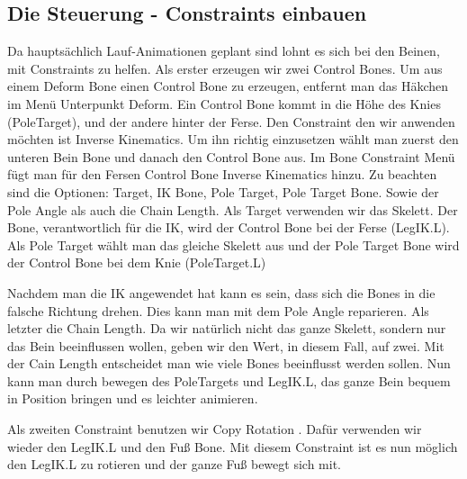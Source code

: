 \subsection{Die Steuerung - Constraints einbauen}
Da hauptsächlich Lauf-Animationen geplant sind lohnt es sich bei den Beinen, mit Constraints zu helfen.
Als erster erzeugen wir zwei Control Bones. Um aus einem Deform Bone einen Control Bone zu erzeugen, entfernt man das Häkchen im Menü Unterpunkt
\dq Deform\dq. Ein Control Bone kommt in die Höhe des Knies (PoleTarget), und der andere hinter der Ferse. Den Constraint den wir anwenden möchten ist
\dq Inverse Kinematics\dq. Um ihn richtig einzusetzen wählt man zuerst den unteren Bein Bone und danach den Control Bone aus. Im Bone Constraint Menü fügt man für den Fersen Control Bone
Inverse Kinematics hinzu. Zu beachten sind die Optionen: Target, IK Bone, Pole Target, Pole Target Bone. Sowie der Pole Angle als auch die Chain Length. Als Target verwenden wir das Skelett.
Der Bone, verantwortlich für die IK,
wird der Control Bone bei der Ferse (LegIK.L). Als Pole Target wählt man das gleiche Skelett aus und der Pole Target Bone wird der Control Bone bei dem Knie (PoleTarget.L)

Nachdem man die IK angewendet hat kann es sein, dass sich die Bones in die falsche Richtung drehen.
Dies kann man mit dem Pole Angle reparieren. Als letzter die Chain Length. Da wir natürlich nicht das ganze Skelett, sondern nur das Bein beeinflussen wollen, geben wir den Wert,
in diesem Fall, auf zwei. Mit der Cain Length entscheidet man wie viele Bones beeinflusst werden sollen.
Nun kann man durch bewegen des PoleTargets und LegIK.L, das ganze Bein bequem in Position bringen und es leichter animieren.

Als zweiten Constraint benutzen wir \dq Copy Rotation \dq.
Dafür verwenden wir wieder den LegIK.L und den Fuß Bone. Mit diesem Constraint ist es nun möglich den LegIK.L zu rotieren und der ganze Fuß bewegt sich mit.

